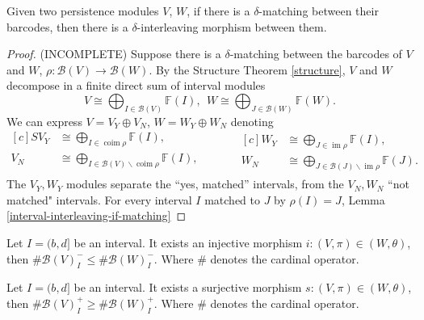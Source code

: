 \begin{proposition}\label{interleaving-if-mathing}
    Given two persistence modules $ V $, $ W $, if there is a $ \delta$-matching between their barcodes, then there is a $ \delta$-interleaving morphism between them.
\end{proposition}
\begin{proof}
    (INCOMPLETE)
    Suppose there is a $\delta$-matching between the barcodes of $ V $ and $ W $, $\rho: \mathcal B (V) \to \mathcal B (W) $. By the Structure Theorem \ref{structure}, $ V $ and $ W $ decompose in a finite direct sum of interval modules
    $$
        V \cong \! \bigoplus_{I \in \mathcal B (V)} \mathbb F (I), \ \ W \cong \! \bigoplus_{J \in  \mathcal B (W)} \mathbb F (W) .
    $$
    We can express $ V = V_Y \oplus V_N $, $ W = W_Y \oplus W_N $ denoting
    \begin{equation*}
        \begin{aligned}[c]S
        V_Y &\cong \bigoplus_{I \in  \operatorname{coim} \rho} \mathbb F (I),\\
        V_N &\cong \bigoplus_{I \in \mathcal B(V) \backslash \operatorname{coim} \rho} \mathbb F (I),\\
        \end{aligned}
        \quad \quad \quad
        \begin{aligned}[c]
        W_Y &\cong \bigoplus_{J \in  \operatorname{im} \rho} \mathbb F (I),\\
        W_N &\cong \bigoplus_{J \in \mathcal B(J) \backslash \operatorname{im} \rho} \mathbb F (J).
        \end{aligned}
    \end{equation*}
    The $ V_Y, W_Y $ modules separate the ``yes, matched'' intervals, from the $ V_N, W_N $ ``not matched" intervals. For every interval $ I $ matched to $ J $ by $\rho(I) = J $, Lemma \ref{interval-interleaving-if-matching}
\end{proof}

\begin{lemma}
    Let $ I = (b, d] $ be an interval. It exists an injective morphism $i: (V, \pi) \in (W, \theta) $, then $\# \mathcal B(V)_I^- \leq \# \mathcal B(W)_I^- $. Where $ \# $ denotes the cardinal operator.
\end{lemma}

\begin{lemma}
    Let $ I = (b, d] $ be an interval. It exists a surjective morphism $s: (V, \pi) \in (W, \theta) $, then $\# \mathcal B(V)_I^+ \geq \# \mathcal B(W)_I^+    $. Where $ \# $ denotes the cardinal operator.
\end{lemma}

